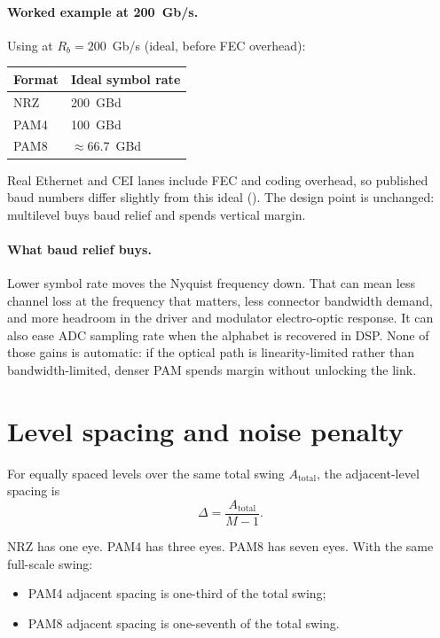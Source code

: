 \paragraph{Worked example at 200~Gb/s.}
Using  at \(R_b=200\)~Gb/s (ideal, before FEC
overhead):

\begin{center}
\footnotesize
\begin{tabular}{@{}ll@{}}
\toprule
Format & Ideal symbol rate \\
\midrule
NRZ & 200~GBd \\
PAM4 & 100~GBd \\
PAM8 & \(\approx\)66.7~GBd \\
\bottomrule
\end{tabular}
\end{center}

Real Ethernet and CEI lanes include FEC and coding overhead, so published baud
numbers differ slightly from this ideal (). The
design point is unchanged: multilevel buys baud relief and spends vertical
margin.

\paragraph{What baud relief buys.}
Lower symbol rate moves the Nyquist frequency down. That can mean less channel
loss at the frequency that matters, less connector bandwidth demand, and more
headroom in the driver and modulator electro-optic response. It can also ease
ADC sampling rate when the alphabet is recovered in DSP. None of those gains is
automatic: if the optical path is linearity-limited rather than
bandwidth-limited, denser PAM spends margin without unlocking the link.

\section{Level spacing and noise penalty}
\label{sec:multilevel-spacing}

For equally spaced levels over the same total swing \(A_{\mathrm{total}}\), the
adjacent-level spacing is
\begin{equation}
\Delta = \frac{A_{\mathrm{total}}}{M-1}.
\label{eq:level-spacing}
\end{equation}

NRZ has one eye. PAM4 has three eyes. PAM8 has seven eyes. With the same
full-scale swing:

\begin{itemize}
\item PAM4 adjacent spacing is one-third of the total swing;
\item PAM8 adjacent spacing is one-seventh of the total swing.
\end{itemize}

